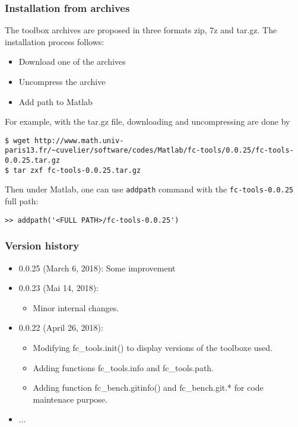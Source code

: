 
\subsubsection{Installation from archives}
The toolbox archives are proposed in three formats zip, 7z and tar.gz. The installation process follows:
\begin{itemize}
\item Download one of the archives
\item Uncompress the archive
\item Add path to Matlab
\end{itemize}

For example, with the tar.gz file, downloading and uncompressing are done by 
\begin{verbatim}
$ wget http://www.math.univ-paris13.fr/~cuvelier/software/codes/Matlab/fc-tools/0.0.25/fc-tools-0.0.25.tar.gz
$ tar zxf fc-tools-0.0.25.tar.gz
\end{verbatim}
Then under Matlab, one can use \texttt{addpath} command with the \texttt{fc-tools-0.0.25} full path:
\begin{verbatim}
>> addpath('<FULL PATH>/fc-tools-0.0.25')
\end{verbatim}

\subsubsection{Version history}

\begin{itemize}
\item 0.0.25 (March 6, 2018): Some improvement
\item 0.0.23 (Mai 14, 2018):
\begin{itemize}
\item Minor internal changes.
\end{itemize}
\item 0.0.22 (April 26, 2018): 
\begin{itemize}
\item Modifying fc_tools.init() to display versions of the toolboxe used.
\item Adding functions fc_tools.info and fc_tools.path.
\item Adding function fc_bench.gitinfo() and fc_bench.git.* for code maintenace purpose.
\end{itemize}
\item ...
\end{itemize}
 
